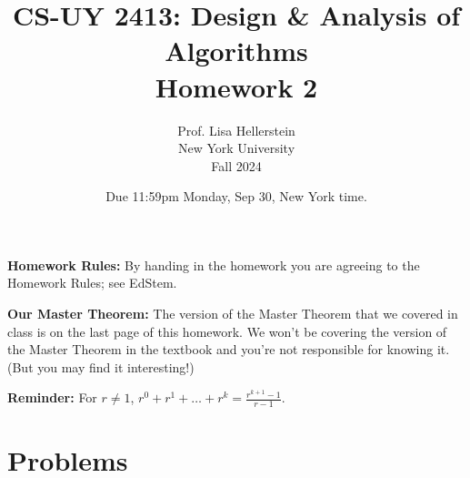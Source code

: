 \documentclass{article}
\title{CS-UY 2413: Design \& Analysis of Algorithms \\ Homework 2}
\author{Prof. Lisa Hellerstein \\ New York University \\ Fall 2024}
\date{Due 11:59pm Monday, Sep 30, New York time.}
\begin{document}
\maketitle

\textbf{Homework Rules:} By handing in the homework you are agreeing to the Homework Rules; see EdStem.

\textbf{Our Master Theorem:} The version of the Master Theorem that we covered in class is on the last page of this homework. We won’t be covering the version of the Master Theorem in the textbook and you’re not responsible for knowing it. (But you may find it interesting!)

\textbf{Reminder:} For $r \neq 1$, $r^0 + r^1 + \dots + r^k = \frac{r^{k+1} - 1}{r - 1}$.

\section*{Problems}
\end{document}
